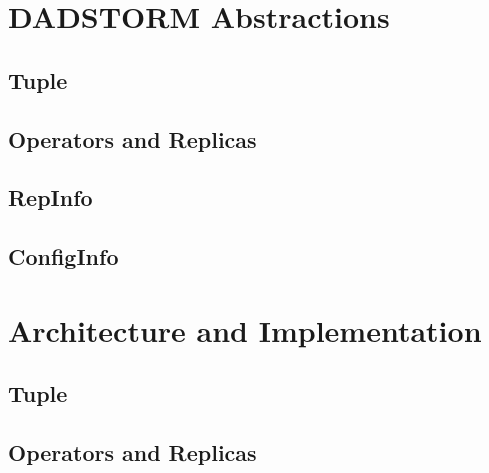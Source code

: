 \documentclass[times, 10pt, twocolumn]{article}
\begin{document}
\section{DADSTORM Abstractions}




\subsection{Tuple}




\subsection{Operators and Replicas}







\subsection{RepInfo}






\subsection{ConfigInfo}






\section{Architecture and Implementation}





\subsection{Tuple}




\subsection{Operators and Replicas}
\end{document}
